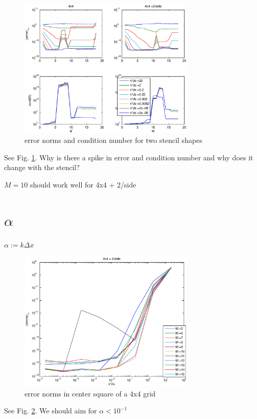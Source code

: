 \documentclass{article}
\begin{document}
\begin{figure}[h!]
  \begin{center}
    \includegraphics[width=0.75\textwidth]{figures/errors_and_conds_vs_M_over_kdx_4x4_and_4x4+2.eps}
    \caption{error norms and condition number for two stencil shapes}
    \label{fig:errors-and-conds}
  \end{center}
\end{figure}

See Fig. \ref{fig:errors-and-conds}.
Why is there a spike in error and condition number and why does it change with the stencil?

$M = 10$ should work well for 4x4 + 2/side

\section*{$\alpha$}
$\alpha := k \Delta x$

\begin{figure}[h!]
  \begin{center}
    \includegraphics[width=0.75\textwidth]{figures/errors_vs_kdx_over_M_4x4+2.eps}
    \caption{error norms in center square of a 4x4 grid}
    \label{fig:errors}
  \end{center}
\end{figure}


See Fig. \ref{fig:errors}. We should aim for $\alpha < 10^{-1}$
\end{document}

